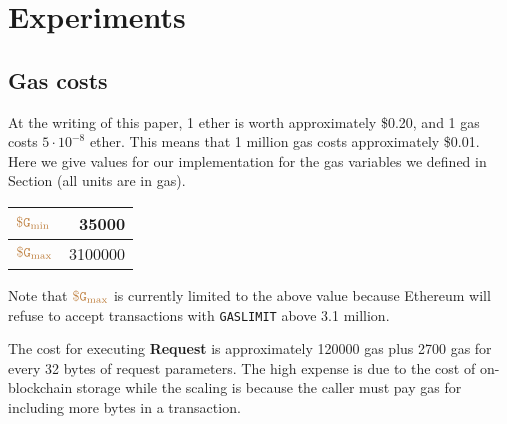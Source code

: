 \section{Experiments}




\subsection{Gas costs}

At the writing of this paper, 1 ether is worth approximately \$0.20, and 1 gas costs $5 \cdot 10^{-8}$ ether.
This means that 1 million gas costs approximately \$0.01.
Here we give values for our implementation for the gas variables we defined in Section  (all units are in gas).
\begin{center}
  \begin{tabular}{lr}
    \hline
    $\tt {\color{brown} \$G_\text{min} }$ & \num[group-separator={,}]{35000} \\
    \hline
    $\tt {\color{brown} \$G_\text{max} }$ & \num[group-separator={,}]{3100000} \\
    \hline
  \end{tabular}
\end{center}
Note that $\tt {\color{brown} \$G_\text{max} }$ is currently limited to the above value because Ethereum will refuse to accept transactions with {\tt GASLIMIT} above 3.1 million.


The cost for executing {\bf Request} is approximately \num[group-separator={,}]{120000} gas plus \num[group-separator={,}]{2700} gas for every 32 bytes of request parameters.
The high expense is due to the cost of on-blockchain storage
while the scaling is because the caller must pay gas for including more bytes in a transaction.


